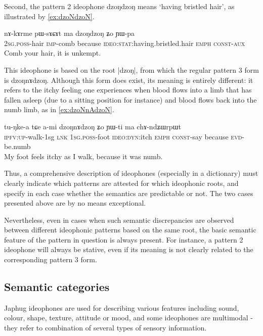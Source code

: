 \documentclass[oldfontcommands,oneside,a4paper,11pt]{article}
\newcommand{\ipa}[1]{{\phon \mbox{#1}}} %
\begin{document}
Second, the  pattern 2 ideophone \ipa{dzoŋdzoŋ} means `having bristled hair', as illustrated by \ref{ex:dzoNdzoN}. 

  \begin{exe} 
\ex  \label{ex:dzoNdzoN}
\gll 
\ipa{nɤ-kɤrme}  	\ipa{pɯ-sɤɕɤt}  	\ipa{ma}  	\ipa{dzoŋdzoŋ}  	\ipa{ʑo}  	\ipa{ɲɯ-pa}  \\
\textsc{2sg.poss}-hair \textsc{imp}-comb because \textsc{ideo:stat}:having.bristled.hair \textsc{emph} \textsc{const}-\textsc{aux} \\
\glt Comb your hair, it is unkempt.
  \end{exe}

This ideophone is based on the root |\ipa{dzoŋ}|, from which the regular pattern 3 form is \ipa{dzoŋnɤdzoŋ}. Although this form does exist, its meaning is entirely different: it refers to the itchy feeling  one experiences when blood flows into a limb that has fallen asleep (due to a sitting position for instance) and blood flows back into the numb limb, as in \ref{ex:dzoNnAdzoN}.

  \begin{exe} 
\ex  \label{ex:dzoNnAdzoN}
\gll 
\ipa{tu-ŋke-a}  	\ipa{tɕe}  	\ipa{a-mi}  	\ipa{dzoŋnɤdzoŋ}  	\ipa{ʑo}  	\ipa{ɲɯ-ti}  	\ipa{ma}  	\ipa{chɤ-ndʑɯrpɯt}  \\
\textsc{ipfv:up}-walk-1sg \textsc{lnk} 1\textsc{sg.poss}-foot \textsc{ideo:dyn}:itch \textsc{emph} \textsc{const}-say because \textsc{evd}-be.numb \\
\glt My foot feels itchy as I walk, because it was numb.
  \end{exe}
  
  
 Thus, a comprehensive description of ideophones (especially in a dictionary) must clearly indicate which patterns are attested for which ideophonic roots, and specify in each case whether the semantics are predictable or not. The two cases presented above are by no means exceptional.


Nevertheless, even in cases when such semantic discrepancies are observed between different ideophonic patterns based on the same root, the basic semantic feature of the pattern in question is always present. For instance, a pattern 2 ideophone will always be stative, even if its meaning is not clearly related to the corresponding pattern 3 form.

\subsection{Semantic categories}
Japhug ideophones are used for describing various features including sound, colour, shape, texture, attitude or mood, and some ideophones are multimodal - they refer to combination of several types of sensory information.
\end{document}
